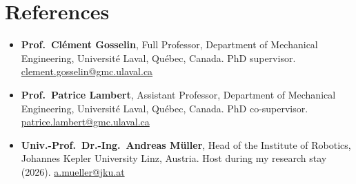 \documentclass[10pt,letterpaper]{article}
\begin{document}
\section{References}
\begin{itemize}
\item \textbf{Prof.~Cl\'ement Gosselin}, Full Professor, Department of Mechanical Engineering, Universit\'e Laval, Qu\'ebec,
Canada. PhD supervisor. \href{mailto:clement.gosselin@gmc.ulaval.ca}{clement.gosselin@gmc.ulaval.ca}
\item \textbf{Prof.~Patrice Lambert}, Assistant Professor, Department of Mechanical Engineering, Universit\'e Laval,
Qu\'ebec, Canada. PhD co-supervisor. \href{mailto:patrice.lambert@gmc.ulaval.ca}{patrice.lambert@gmc.ulaval.ca}
\item \textbf{Univ.-Prof.~Dr.-Ing.~Andreas M\"uller}, Head of the Institute of Robotics, Johannes Kepler University Linz,
Austria. Host during my research stay (2026). \href{mailto:a.mueller@jku.at}{a.mueller@jku.at}
\end{itemize}
\end{document}
